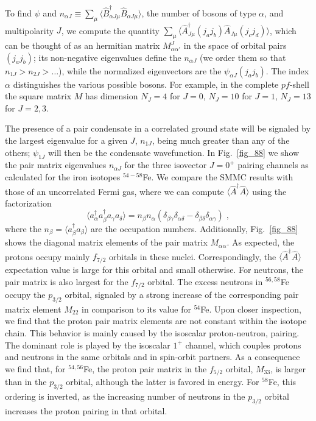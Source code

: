 \documentclass[rmp,aps,floatfix]{revtex4}
\begin{document}
To find $\psi$ and \hbox{$n_{\alpha J}\equiv\sum_\mu\langle
\hat{B}^\dagger_{\alpha J\mu}
\hat{B}_{\alpha J\mu}\rangle$}, the number of bosons of type
$\alpha$, and multipolarity $J$, we compute the quantity
$\sum_\mu\langle \hat{A}^\dagger_{J\mu}(j_aj_b)\hat{A}_{J\mu} (j_cj_d)\rangle$,
which can be thought of as an hermitian matrix $M^J_{\alpha\alpha'}$
in the space of orbital pairs
$(j_aj_b)$; its non-negative eigenvalues define the $n_{\alpha J}$ (we
order them so that $n_{1 J}> n_{2 J}> \ldots$), while the
normalized eigenvectors are the $\psi_{\alpha J}(j_aj_b)$.
The index $\alpha$ distinguishes the various possible bosons.
For example, in the complete $pf$-shell the square matrix $M$ has
dimension $N_J=4$ for $J=0$, $N_J=10$ for $J=1$, $N_J=13$ for $J=2,3$.

The presence of a pair condensate in a correlated ground state will be
signaled by the largest eigenvalue for a given $J$, $n_{1 J}$,
being much greater than any of the others; $\psi_{1J}$ will then be the
condensate wavefunction.
In Fig.~\ref{fig_88} we show the pair matrix eigenvalues $n_{\alpha J}$
for the three isovector $J=0^+$ pairing channels as calculated for the iron
isotopes $^{54-58}$Fe. We compare the SMMC results with those of an
uncorrelated Fermi gas, where
we can compute $\langle \hat{A}^\dagger \hat{A}\rangle$ using the
factorization
\begin{equation}\langle a^\dagger_\alpha a^\dagger_\beta a_\gamma
a_\delta\rangle=
n_\beta n_\alpha (\delta_{\beta\gamma} \delta_{\alpha\delta}-
\delta_{\beta\delta}\delta_{\alpha\gamma})\;,
\label{equation_13}
\end{equation}
where the $n_\beta=\langle a^\dagger_\beta a_\beta\rangle$ are the occupation
numbers. Additionally, Fig.~\ref{fig_88} 
shows the diagonal matrix elements of the
pair matrix $M_{\alpha\alpha}$. As expected, the protons occupy mainly
$f_{7/2}$ orbitals in these nuclei. Correspondingly,
the $\langle \hat{A}^\dagger \hat{A} \rangle$
expectation value is large for this orbital and small otherwise.
For neutrons, the pair matrix is also largest for the $f_{7/2}$ orbital.
The excess neutrons in $^{56,58}$Fe occupy the $p_{3/2}$ orbital,
signaled by a strong increase of the corresponding pair matrix element
$M_{22}$ in comparison to its value for $^{54}$Fe. Upon closer inspection,
we find that the proton pair matrix elements are not constant within the
isotope chain. This behavior is mainly caused by the isoscalar proton-neutron,
pairing. The dominant role is played by the isoscalar $1^+$ channel, which
couples protons and neutrons in the same orbitals and in spin-orbit partners.
As a consequence we find that, for $^{54,56}$Fe, the proton pair matrix in the
$f_{5/2}$ orbital, $M_{33}$, is larger than in the $p_{3/2}$ orbital,
although the latter is favored in energy. For $^{58}$Fe, this ordering
is inverted, as
the increasing number of neutrons in the $p_{3/2}$ orbital
increases the proton pairing in that orbital.
\end{document}
